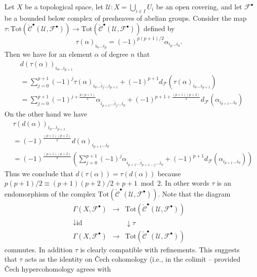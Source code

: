 Let $X$ be a topological space, let $\mathcal{U} : X = \bigcup_{i \in I} U_i$
be an open covering, and let $\mathcal{F}^\bullet$ be a bounded below
complex of presheaves of abelian groups. Consider the map
$\tau :
\text{Tot}(\check{\mathcal{C}}^\bullet({\mathcal U}, {\mathcal F}^\bullet))
\to
\text{Tot}(\check{\mathcal{C}}^\bullet({\mathcal U}, {\mathcal F}^\bullet))$
defined by
$$
\tau(\alpha)_{i_0 \ldots i_p} = (-1)^{p(p + 1)/2} \alpha_{i_p \ldots i_0}.
$$
Then we have for an element $\alpha$ of degree $n$ that
\begin{align*}
& d(\tau(\alpha))_{i_0 \ldots i_{p + 1}} \\
& =
\sum\nolimits_{j = 0}^{p + 1}
(-1)^j
\tau(\alpha)_{i_0 \ldots \hat i_j \ldots i_{p + 1}}
+
(-1)^{p + 1}
d_{\mathcal F}(\tau(\alpha)_{i_0 \ldots i_{p + 1}})
\\
& =
\sum\nolimits_{j = 0}^{p + 1}
(-1)^{j + \frac{p(p + 1)}{2}}
\alpha_{i_{p + 1} \ldots \hat i_j \ldots i_0}
+
(-1)^{p + 1 + \frac{(p + 1)(p + 2)}{2}}
d_{\mathcal F}(\alpha_{i_{p + 1} \ldots i_0})
\end{align*}
On the other hand we have
\begin{align*}
& \tau(d(\alpha))_{i_0\ldots i_{p + 1}} \\
& =
(-1)^{\frac{(p + 1)(p + 2)}{2}} d(\alpha)_{i_{p + 1} \ldots i_0}
\\
& =
(-1)^{\frac{(p + 1)(p + 2)}{2}}
\left(
\sum\nolimits_{j = 0}^{p + 1}
(-1)^j
\alpha_{i_{p + 1}\ldots \hat i_{p + 1 - j} \ldots i_0}
+
(-1)^{p + 1}
d_{\mathcal F}(\alpha_{i_{p + 1}\ldots i_0})
\right)
\end{align*}
Thus we conclude that $d(\tau(\alpha)) = \tau(d(\alpha))$
because $p(p + 1)/2 \equiv (p + 1)(p + 2)/2 + p + 1 \bmod 2$. In other words
$\tau$ is an endomorphism of the complex
$\text{Tot}(\check{\mathcal{C}}^\bullet({\mathcal U}, {\mathcal F}^\bullet))$.
Note that the diagram
$$
\begin{matrix}
\Gamma(X, {\mathcal F}^\bullet) &
\longrightarrow &
\text{Tot}(\check{\mathcal{C}}^\bullet({\mathcal U}, {\mathcal F}^\bullet)) \\
\downarrow \text{id} & & \downarrow \tau \\
\Gamma(X, {\mathcal F}^\bullet) &
\longrightarrow &
\text{Tot}(\check{\mathcal{C}}^\bullet({\mathcal U}, {\mathcal F}^\bullet))
\end{matrix}
$$
commutes. In addition $\tau$ is clearly compatible with refinements.
This suggests that $\tau$ acts as the identity on {\v C}ech cohomology
(i.e., in the colimit -- provided {\v C}ech hypercohomology agrees with
